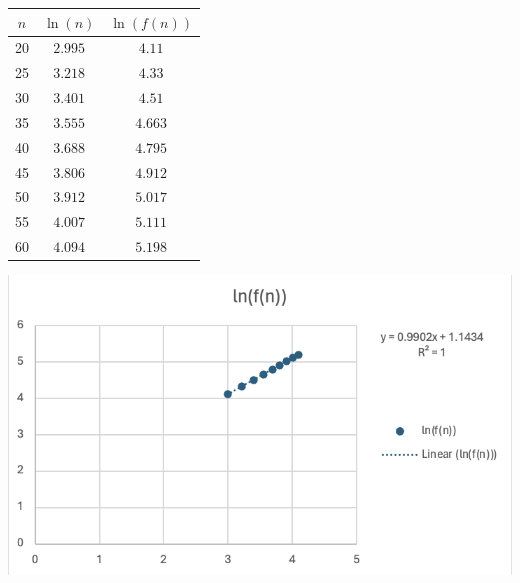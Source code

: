 \documentclass{article}
\begin{document}
\noindent
\begin{minipage}{0.3\textwidth} %
    \centering

    
    
    \begin{tabular}{c|c|c}
        $n$ & $\ln(n)$ & $\ln(f(n))$ \\ \hline
        20 & $2.995$ & $4.11$ \\\hline
        25 & $3.218$ & $4.33$  \\\hline
        30 & $3.401$ & $4.51$\\\hline
        35 & $3.555$ & $4.663$\\\hline
        40 & $3.688$ & $4.795$\\ \hline
        45 & $3.806$ & $4.912$\\ \hline
        50 & $3.912$ & $5.017$\\ \hline
        55 & $4.007$ & $5.111$\\ \hline
        60 & $4.094$ & $5.198$\\
    \end{tabular}

    
    
\end{minipage}%
\begin{minipage}{0.6\textwidth} %

    

    \centering
    \includegraphics[width=1\linewidth]{Graphs/3n+1.png} %

     
    
\end{minipage}
\end{document}
